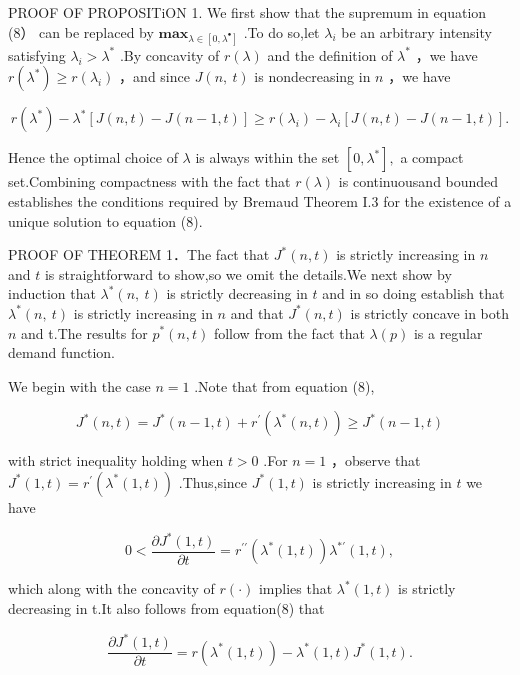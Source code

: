 PROOF OF PROPOSITiON 1. We first show that the supremum in equation (8）
can be replaced by
\(\mathbf { m a x } _ { \lambda \in [ 0 , \lambda ^ { \bullet } ] }\)
.To do so,let \(\lambda _ { i }\) be an arbitrary intensity satisfying
\({ \lambda } _ { i } > { \lambda } ^ { * }\) .By concavity of
\(r ( \lambda )\) and the definition of \(\lambda ^ { * }\) ，we have
\(r ( \lambda ^ { * } ) \geq r ( \lambda _ { i } )\) ，and since
\(J ( n , \ t )\) is nondecreasing in \(n\) ，we have

\[
r ( \lambda ^ { * } ) - \lambda ^ { * } [ J ( n , t ) - J ( n - 1 , t ) ] \geq r ( \lambda _ { i } ) - \lambda _ { i } [ J ( n , t ) - J ( n - 1 , t ) ] .
\]

Hence the optimal choice of \(\lambda\) is always within the set
\([ 0 , \lambda ^ { * } ] ,\) a compact set.Combining compactness with
the fact that \(r ( \lambda )\) is continuousand bounded establishes the
conditions required by Bremaud Theorem I.3 for the existence of a unique
solution to equation (8).

PROOF OF THEOREM 1．The fact that \(J ^ { * } ( n , t )\) is strictly
increasing in \(n\) and \(t\) is straightforward to show,so we omit the
details.We next show by induction that \(\lambda ^ { * } ( n , \ t )\)
is strictly decreasing in \(t\) and in so doing establish that
\(\lambda ^ { * } ( n , \ t )\) is strictly increasing in \(n\) and that
\(J ^ { * } ( n , t )\) is strictly concave in both \(n\) and t.The
results for \(p ^ { * } ( n , t )\) follow from the fact that
\(\lambda ( p )\) is a regular demand function.

We begin with the case \(n = 1\) .Note that from equation (8),

\[
J ^ { * } ( n , t ) = J ^ { * } ( n - 1 , t ) + r ^ { \prime } ( \lambda ^ { * } ( n , t ) ) \geq J ^ { * } ( n - 1 , t )
\]

with strict inequality holding when \(t > 0\) .For \(n = 1\) ，observe
that
\(J ^ { * } ( 1 , t ) = r ^ { \prime } ( \lambda ^ { * } ( 1 , t ) )\)
.Thus,since \(J ^ { * } ( 1 , t )\) is strictly increasing in \(t\) we
have

\[
0 < \frac { \partial J ^ { * } ( 1 , t ) } { \partial t } = r ^ { \prime \prime } ( \lambda ^ { * } ( 1 , t ) ) \lambda ^ { * \prime } ( 1 , t ) ,
\]

which along with the concavity of \(r ( \cdot )\) implies that
\(\lambda ^ { * } ( 1 , t )\) is strictly decreasing in t.It also
follows from equation(8) that

\[
\frac { \partial J ^ { * } ( 1 , t ) } { \partial t } = r ( \lambda ^ { * } ( 1 , t ) ) - \lambda ^ { * } ( 1 , t ) J ^ { * } ( 1 , t ) .
\]

